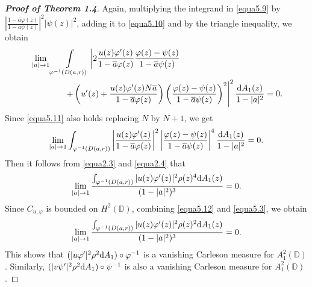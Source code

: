 \documentclass[preprint,12pt,times]{elsarticle}
\theoremstyle{definition}
\theoremstyle{remark}
\numberwithin{equation}{section}
\begin{document}
\begin{proof}[{\bf Proof of Theorem 1.4}]
Again, multiplying the integrand in \eqref{equa5.9} by $\left|\frac{1-\overline{a}\varphi(z)}{1-\overline{a}\psi(z)}\right|^2|\psi(z)|^2$, adding it to \eqref{equa5.10} and by the triangle inequality, we obtain
\begin{align}\label{equa5.11}
&\lim_{|a|\to 1}\int\limits_{\varphi^{-1}(D(a,r))}\left|2\frac{u(z)\varphi'(z)}{1-\overline{a}\varphi(z)}\frac{\varphi(z)-\psi(z)}{1-\overline{a}\psi(z)}\right.\nonumber\\
&\qquad\qquad\left.+\left(u'(z)+\frac{u(z)\varphi'(z)N\overline{a}}{1-\overline{a}\varphi(z)}\right)\left(\frac{\varphi(z)-\psi(z)}{1-\overline{a}\psi(z)}\right)^2\right|^2\frac{{\rm d}A_1(z)}{1-|a|^2}=0.
\end{align}
Since \eqref{equa5.11} also holds replacing $N$ by $N+1$, we get 
\begin{align*}
\lim_{|a|\to 1}\int_{\varphi^{-1}(D(a,r))}\left|\frac{u(z)\varphi'(z)}{1-\overline{a}\varphi(z)}\right|^2\left|\frac{\varphi(z)-\psi(z)}{1-\overline{a}\psi(z)}\right|^4\frac{{\rm d}A_1(z)}{1-|a|^2}=0.
\end{align*}
Then it follows from \eqref{equa2.3} and \eqref{equa2.4} that
\begin{align}\label{equa5.12}
\lim_{|a|\to 1}\frac{\int_{\varphi^{-1}(D(a,r))}|u(z)\varphi'(z)|^2\rho(z)^4{\rm d}A_1(z)}{(1-|a|^2)^3}=0.
\end{align}
Since $C_{u,\varphi}$ is bounded on $H^2(\mathbb{D})$, combining \eqref{equa5.12} and \eqref{equa5.3}, we obtain
\begin{align}\label{equa5.13}
\lim_{|a|\to 1}\frac{\int_{\varphi^{-1}(D(a,r))}|u(z)\varphi'(z)|^2\rho(z)^2{\rm d}A_1(z)}{(1-|a|^2)^3}=0.
\end{align}
This shows that $(|u\varphi'|^2\rho^2{\rm d}A_1)\circ\varphi^{-1}$ is a vanishing Carleson measure for $A_1^2(\mathbb{D})$. Similarly, $(|v\psi'|^2\rho^2{\rm d}A_1)\circ\psi^{-1}$ is also a vanishing Carleson measure for $A_1^2(\mathbb{D})$.


\end{proof}
\end{document}
